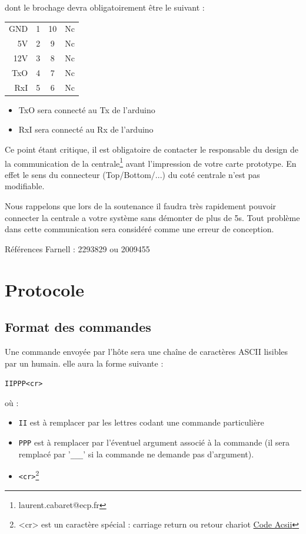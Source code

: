 \documentclass[a4paper, 10pt]{article} %
\begin{document}
dont le brochage devra obligatoirement être le suivant :

\begin{center}
\begin{tabular}{r|c||c|l}
GND&1&10&Nc\\
5V&2&9&Nc\\
12V&3&8&Nc\\
TxO&4&7&Nc\\
RxI&5&6&Nc\\
\end{tabular}
\end{center}


\begin{itemize}
\item TxO sera connecté au Tx de l'arduino
\item RxI sera connecté au Rx de l'arduino
\end{itemize}


Ce point étant critique, il est obligatoire de contacter le responsable du design de la communication de la centrale\footnote{laurent.cabaret@ecp.fr} avant l'impression  de votre carte prototype.
En effet le sens du connecteur (Top/Bottom/...) du coté centrale n'est pas modifiable.

Nous rappelons que lors de la soutenance il faudra très rapidement pouvoir connecter la centrale a votre système sans démonter de plus de 5s. Tout problème dans cette communication sera considéré comme une erreur de conception.

Références Farnell : 2293829 ou 2009455
\section{Protocole}

\subsection{Format des commandes}

Une commande envoyée par l'hôte sera une chaîne de caractères ASCII lisibles par un humain. elle aura la
forme suivante :
\begin{center}
  \verb|IIPPP<cr>|
\end{center}

où :
\begin{itemize}
  \item \verb|II| est à remplacer par les lettres codant une commande particulière
  \item \verb|PPP| est à remplacer par l'éventuel argument associé à la commande (il sera remplacé par '\verb|___|' si
    la commande ne demande pas d'argument).
  \item \verb|<cr>|\footnote{<cr> est un caractère spécial : carriage return ou retour chariot \href{http://fr.wikipedia.org/wiki/American_Standard_Code_for_Information_Interchange}{Code Acsii}}
\end{itemize}
\end{document}
